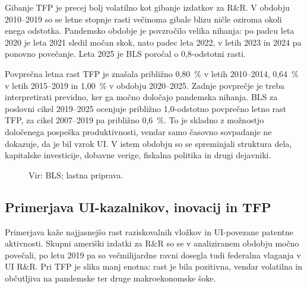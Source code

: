 \documentclass[12pt,a4paper]{article}
\begin{document}
Gibanje TFP je precej bolj volatilno kot gibanje izdatkov za R\&R. V obdobju 2010--2019 so se letne stopnje rasti večinoma gibale blizu ničle oziroma okoli enega odstotka. Pandemsko obdobje je povzročilo velika nihanja: po padcu leta 2020 je leta 2021 sledil močan skok, nato padec leta 2022, v letih 2023 in 2024 pa ponovno povečanje. Leta 2025 je BLS poročal o 0,8-odstotni rasti.

Povprečna letna rast TFP je znašala približno 0,80~\% v letih 2010--2014, 0,64~\% v letih 2015--2019 in 1,00~\% v obdobju 2020--2025. Zadnje povprečje je treba interpretirati previdno, ker ga močno določajo pandemska nihanja. BLS za poslovni cikel 2019--2025 ocenjuje približno 1,0-odstotno povprečno letno rast TFP, za cikel 2007--2019 pa približno 0,6~\%. To je skladno z možnostjo določenega pospeška produktivnosti, vendar samo časovno sovpadanje ne dokazuje, da je bil vzrok UI. V istem obdobju so se spreminjali struktura dela, kapitalske investicije, dobavne verige, fiskalna politika in drugi dejavniki.

\begin{figure}[H]
\centering
{}
\caption{Letna rast TFP v zasebnem nekmetijskem poslovnem sektorju ZDA, 2010--2025}
\caption*{\footnotesize Vir: BLS; lastna priprava.}
\label{fig:tfp}
\end{figure}

\subsection{Primerjava UI-kazalnikov, inovacij in TFP}

Primerjava kaže najjasnejšo rast raziskovalnih vložkov in UI-povezane patentne aktivnosti. Skupni ameriški izdatki za R\&R so se v analiziranem obdobju močno povečali, po letu 2019 pa so večmilijardne ravni dosegla tudi federalna vlaganja v UI R\&R. Pri TFP je slika manj enotna: rast je bila pozitivna, vendar volatilna in občutljiva na pandemske ter druge makroekonomske šoke.
\end{document}

